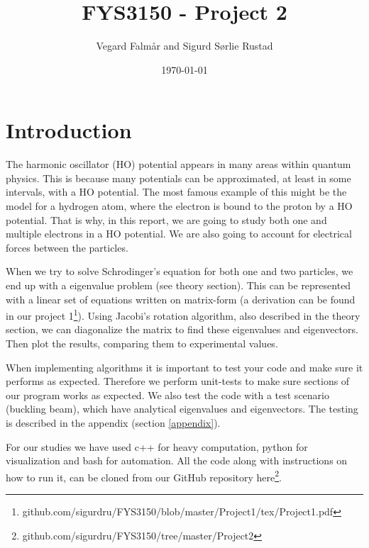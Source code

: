 \documentclass[reprint,english,notitlepage,nofootinbib]{revtex4-1}  %
\begin{document}
\title{FYS3150 - Project 2}
\date{\today}
\author{Vegard Falmår and Sigurd Sørlie Rustad}

\newpage

\begin{abstract}

\end{abstract}
\maketitle


\section{Introduction}

The harmonic oscillator (HO) potential appears in many areas within quantum physics. This is because many potentials can be approximated, at least in some intervals, with a HO potential. The most famous example of this might be the model for a hydrogen atom, where the electron is bound to the proton by a HO potential. That is why, in this report, we are going to study both one and multiple electrons in a HO potential. We are also going to account for electrical forces between the particles.

When we try to solve Schrodinger's equation for both one and two particles, we end up with a eigenvalue problem (see theory section). This can be represented with a linear set of equations written on matrix-form (a derivation can be found in our project 1\footnote{github.com/sigurdru/FYS3150/blob/master/Project1/tex/Project1.pdf}). Using Jacobi's rotation algorithm, also described in the theory section, we can diagonalize the matrix to find these eigenvalues and eigenvectors. Then plot the results, comparing them to experimental values.

When implementing algorithms it is important to test your code and make sure it performs as expected. Therefore we perform unit-tests to make sure sections of our program works as expected. We also test the code with a test scenario (buckling beam), which have analytical eigenvalues and eigenvectors. The testing is described in the appendix (section \ref{appendix}).

For our studies we have used c++ for heavy computation, python for visualization and bash for automation. All the code along with instructions on how to run it, can be cloned from our GitHub repository here\footnote{github.com/sigurdru/FYS3150/tree/master/Project2}.
\end{document}
